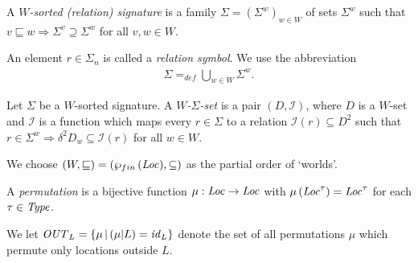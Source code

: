 \documentclass[12pt,a4paper]{report}
\newcommand{\OUT}{\nstyle{OUT}}
\newcommand{\I}{\mathcal{I}}
\newcommand{\id}{\nstyle{id}}
\begin{document}
\begin{definition}
  A {\em $W$-sorted (relation) signature} is a family $\Sigma=(\Sigma^w)_{w\in W}$
  of sets $\Sigma^w$ such that
  $v \sqsubseteq w \Rightarrow \Sigma^v \supseteq \Sigma^w$
  for all $v,w\in W$.
\end{definition}

An element $r \in \Sigma_n$ is called a {\em relation symbol}. We use the abbreviation
\[\begin{array}{rcl}
  \Sigma =_{def} \bigcup_{w\in W} \Sigma^w.
\end{array}\]

\begin{definition}
  Let $\Sigma$ be a $W$-sorted signature. A {\em $W$-$\Sigma$-set} is a pair
  $(D,\I)$, where $D$ is a $W$-set and $\I$ is a function which maps every
  $r \in \Sigma$ to a relation $\I(r) \subseteq D^2$ such that
  $r \in \Sigma^w \Rightarrow \delta^2 D_w \subseteq \I(r)$ for all $w \in W$.
\end{definition}

We choose $(W,\sqsubseteq) = (\wp_{fin}\,(\mathit{Loc}),\subseteq)$ as the partial order of `worlds'.

\begin{definition}
  A {\em permutation} is a bijective function $\mu:\mathit{Loc}\to\mathit{Loc}$ with
  $\mu\,(\mathit{Loc}^\tau)=\mathit{Loc}^\tau$ for each $\tau\in\mathit{Type}$.
\end{definition}

We let $\OUT_L = \{\mu\,|\,(\mu|L) = \id_L\}$
denote the set of all permutations $\mu$ which permute only locations outside $L$.
\end{document}
